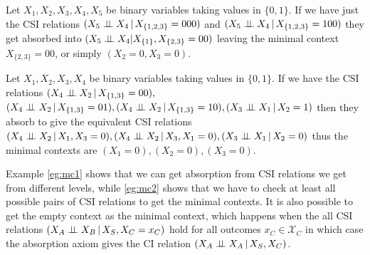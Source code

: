 \documentclass{tufte-book}
\begin{document}
\begin{example}\label{eg:mc1}
Let $X_1,X_2,X_3,X_4,X_5$ be binary variables taking values in $\{0,1\}$. If we have just the CSI relations $(X_5 \perp \!\!\! \perp X_4 \,|\, X_{\{1,2,3\}}=000)$ and $(X_5 \perp \!\!\! \perp X_4 \,|\, X_{\{1,2,3\}}=100)$ they get absorbed into $(X_5 \perp \!\!\! \perp X_4 | X_{\{1\}}, X_{\{2,3\}}=00)$ leaving the minimal context $X_{\{2,3\}}=00$, or simply $(X_2 = 0, X_3=0)$.
\end{example}

\begin{example}\label{eg:mc2}
Let $X_1,X_2,X_3,X_4$ be binary variables taking values in $\{0,1\}$. If we have the  CSI relations $(X_4 \perp \!\!\! \perp X_2 \,|\, X_{\{1,3\}}=00), $\\$ (X_4 \indep X_2 \,|\, X_{\{1,3\}}=01), (X_4 \indep X_2 \,|\, X_{\{1,3\}}=10), (X_3 \indep X_1 \,|\, X_2=1)$ then they absorb to give the equivalent CSI relations $(X_4 \indep X_2 \, |\,X_1, X_3=0), (X_4 \indep X_2 \,|\, X_3, X_1=0), (X_3 \indep X_1 \,|\,X_2=0)$ thus the minimal contexts are $(X_1=0),(X_2=0),(X_3=0)$.
\end{example}

Example \ref{eg:mc1} shows that we can get absorption from CSI relations we get from different levels, while \ref{eg:mc2} shows that we have to check at least all possible pairs of CSI relations to get the minimal contexts. It is also possible to get the empty context as the minimal context, which happens when the all CSI relations \((X_A \perp \!\!\! \perp X_B \,|\, X_S, X_C=x_C)\) hold for all outcomes \(x_C \in \mathcal{X}_C\) in which case the absorption axiom gives the CI relation \((X_A \perp \!\!\! \perp X_A\,|\,X_S,X_C)\).
\end{document}
